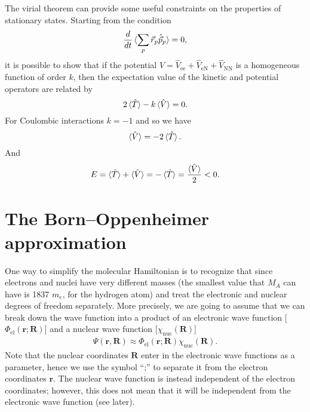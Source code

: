 \documentclass[../Main/chem532-notes.tex]{subfiles}
\begin{document}
The virial theorem can provide some useful constraints on the properties of stationary states.
Starting from the condition
\begin{equation}
\frac{d}{dt} \braket{\sum_p \vec{r}_p \hat{\vec{p}}_p} = 0,
\end{equation}
it is possible to show that if the potential $\hat{V} =  \hat{V}_\mathrm{ee} + \hat{V}_\mathrm{eN} + \hat{V}_\mathrm{NN}$ is a homogeneous function of order $k$, then the expectation value of the kinetic and potential operators are related by
\begin{equation}
2 \braket{\hat{T}} -k \braket{\hat{V}} = 0.
\end{equation}
For Coulombic interactions $k = -1$ and so we have
\begin{equation}
\braket{\hat{V}} = -2 \braket{\hat{T}}.
\end{equation}
And
\begin{equation}
E = \braket{\hat{T}} + \braket{\hat{V}} = - \braket{\hat{T}} = \frac{\braket{\hat{V}}}{2} < 0.
\end{equation}


\section{The Born--Oppenheimer approximation}
One way to simplify the molecular Hamiltonian is to recognize that since electrons and nuclei have very different masses (the smallest value that $M_A$ can have is 1837 $m_e$, for the hydrogen atom) and treat the electronic and nuclear degrees of freedom separately.
More precisely, we are going to assume that we can break down the wave function into a product of an electronic wave function [$\Phi_{\mathrm{el}}(\mathbf{r};\mathbf{R})$] and a nuclear wave function [$\chi_{\mathrm{nuc}}(\mathbf{R})$]
\begin{equation}
\begin{split}
\Psi(\mathbf{r},\mathbf{R}) \approx \Phi_{\mathrm{el}}(\mathbf{r};\mathbf{R}) \chi_{\mathrm{nuc}}(\mathbf{R}).
\end{split}
\end{equation}
Note that the nuclear coordinates $\mathbf{R}$ enter in the electronic wave functions as a parameter, hence we use the symbol ``;'' to separate it from the electron coordinates $\mathbf{r}$. The nuclear wave function is instead independent of the electron coordinates; however, this does not mean that it will be independent from the electronic wave function (see later).
\end{document}
